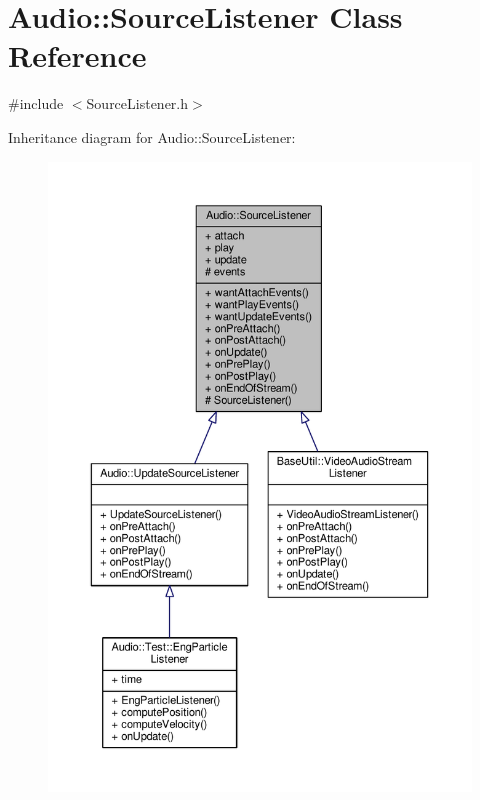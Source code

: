\hypertarget{classAudio_1_1SourceListener}{}\section{Audio\+:\+:Source\+Listener Class Reference}
\label{classAudio_1_1SourceListener}


{\ttfamily \#include $<$Source\+Listener.\+h$>$}



Inheritance diagram for Audio\+:\+:Source\+Listener\+:
\nopagebreak
\begin{figure}[H]
\begin{center}
\leavevmode
\includegraphics[width=350pt]{dc/ddb/classAudio_1_1SourceListener__inherit__graph}
\end{center}
\end{figure}


